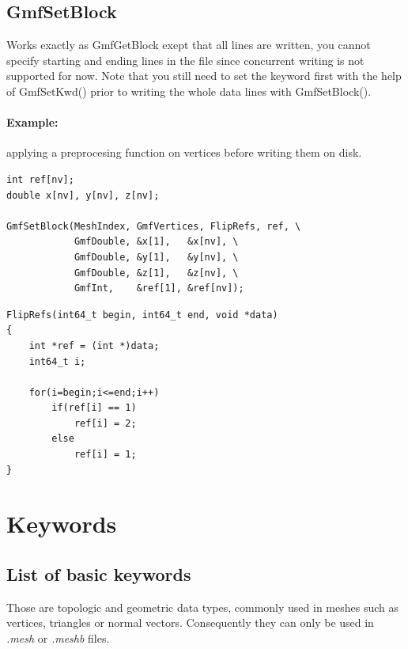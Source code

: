 \documentclass[a4paper,12pt]{article}
\begin{document}
\subsection{GmfSetBlock}
Works exactly as GmfGetBlock exept that all lines are written, you cannot specify starting and ending lines in the file since concurrent writing is not supported for now. Note that you still need to set the keyword first with the help of GmfSetKwd() prior to writing the whole data lines with GmfSetBlock().

\paragraph{Example:} applying a preprocesing function on vertices before writing them on disk.

\begin{tt}
\begin{verbatim}
int ref[nv];
double x[nv], y[nv], z[nv];

GmfSetBlock(MeshIndex, GmfVertices, FlipRefs, ref, \
            GmfDouble, &x[1],   &x[nv], \
            GmfDouble, &y[1],   &y[nv], \
            GmfDouble, &z[1],   &z[nv], \
            GmfInt,    &ref[1], &ref[nv]);
\end{verbatim}
\end{tt}
\normalfont

\begin{tt}
\begin{verbatim}
FlipRefs(int64_t begin, int64_t end, void *data)
{
    int *ref = (int *)data;
    int64_t i;

    for(i=begin;i<=end;i++)
        if(ref[i] == 1)
            ref[i] = 2;
        else
            ref[i] = 1;
}
\end{verbatim}
\end{tt}
\normalfont


%
%

\newpage
\section{Keywords}
\label{keywords}

\subsection{List of basic keywords}

Those are topologic and geometric data types, commonly used in meshes such as vertices, triangles or normal vectors. Consequently they can only be used in \emph{.mesh} or \emph{.meshb} files.
\end{document}
